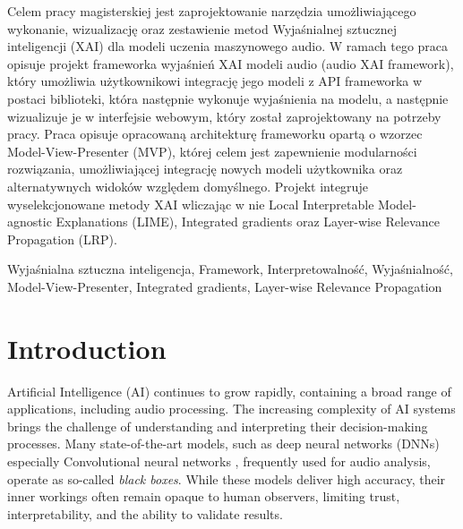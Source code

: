 \documentclass[
    bindingoffset=5mm,  %
    footnoteindent=3mm, %
    hyphenation=true    %
]{src/wut-thesis}
\begin{document}
Celem pracy magisterskiej jest zaprojektowanie narzędzia umożliwiającego wykonanie,
wizualizację oraz zestawienie metod Wyjaśnialnej sztucznej inteligencji (XAI) dla modeli uczenia maszynowego audio.
W ramach tego praca opisuje projekt frameworka wyjaśnień XAI modeli audio (audio XAI framework),
który umożliwia użytkownikowi integrację jego modeli z API frameworka w postaci biblioteki,
która następnie wykonuje wyjaśnienia na modelu, a następnie wizualizuje je w interfejsie
webowym, który został zaprojektowany na potrzeby pracy. Praca opisuje opracowaną architekturę frameworku
opartą o wzorzec Model-View-Presenter (MVP), której celem jest zapewnienie modularności rozwiązania, umożliwiającej
integrację nowych modeli użytkownika oraz alternatywnych widoków względem domyślnego.
Projekt integruje wyselekcjonowane metody XAI wliczając w nie Local Interpretable Model-agnostic Explanations (LIME),
Integrated gradients oraz Layer-wise Relevance Propagation (LRP).


\secondkeywords Wyjaśnialna sztuczna inteligencja, Framework, Interpretowalność, Wyjaśnialność, Model-View-Presenter, Integrated gradients, Layer-wise Relevance Propagation

\pagestyle{plain}

\cleardoublepage %
\tableofcontents

\cleardoublepage %
\pagestyle{headings}

%
%
\clearpage %
\section{Introduction} \label{ch:introduction}

Artificial Intelligence (AI) continues to grow rapidly, containing a broad range of applications,
including audio processing. The increasing complexity of AI systems brings the challenge of understanding
and interpreting their decision-making processes. Many state-of-the-art models, such as deep
neural networks (DNNs) especially Convolutional neural networks \cite{Lecun1998},
frequently used for audio analysis, operate as so-called \emph{black boxes}. While these models deliver high accuracy,
their inner workings often remain opaque to human observers, limiting trust, interpretability,
and the ability to validate results.
\end{document}
